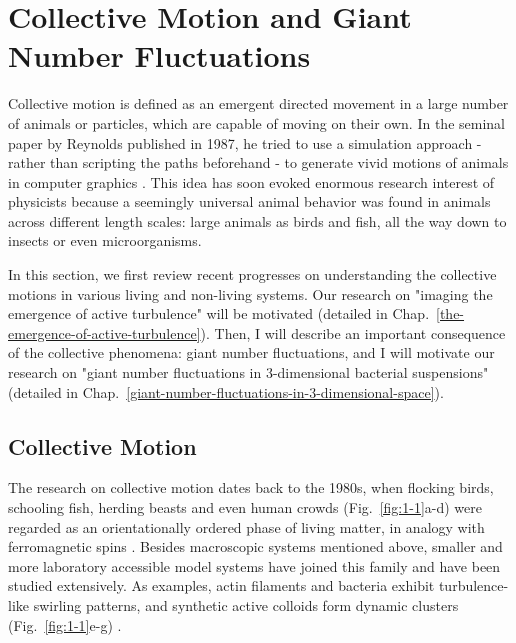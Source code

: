 \section{Collective Motion and Giant Number Fluctuations}
Collective motion is defined as an emergent directed movement in a large number of animals or particles, which are capable of moving on their own. In the seminal paper by Reynolds published in 1987, he tried to use a simulation approach - rather than scripting the paths beforehand - to generate vivid motions of animals in computer graphics \cite{Reynolds1987}. This idea has soon evoked enormous research interest of physicists because a seemingly universal animal behavior was found in animals across different length scales: large animals as birds and fish, all the way down to insects or even microorganisms.

In this section, we first review recent progresses on understanding the collective motions in various living and non-living systems. Our research on "imaging the emergence of active turbulence" will be motivated
(detailed in Chap.~\ref{the-emergence-of-active-turbulence}). Then, I will describe an important consequence of the collective phenomena: giant number fluctuations, and I will motivate our research on "giant number fluctuations in 3-dimensional bacterial suspensions" (detailed in Chap.~\ref{giant-number-fluctuations-in-3-dimensional-space}).

\subsection{Collective Motion}
The research on collective motion dates back to the 1980s, when flocking birds, schooling fish, herding beasts and even human crowds (Fig.~\ref{fig:1-1}a-d) were regarded as an orientationally ordered phase of living matter, in analogy with ferromagnetic spins
\cite{Reynolds1987, Vicsek1995, Narayan2007, Ward2008, Ballerini2008, Silverberg2013}. Besides macroscopic systems mentioned above, smaller and more laboratory accessible model systems have joined this family and have been studied extensively. As examples, actin filaments and bacteria exhibit turbulence-like swirling patterns, and synthetic active colloids form dynamic clusters (Fig.~\ref{fig:1-1}e-g)
\cite{Dunkel2013, Wensink2012, Buttinoni2013, Palacci2013, Sanchez2012, Schaller2010, Sokolov2007}.



